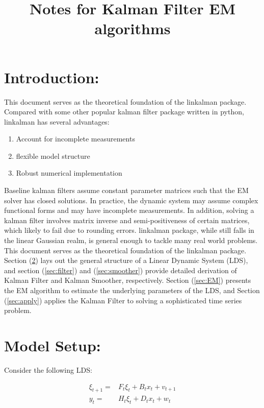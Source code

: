 \documentclass[12pt]{article}
\newenvironment{boenumerate}
    {\begin{enumerate}\renewcommand\labelenumi{\textbf\theenumi}}
    {\end{enumerate}}
\numberwithin{equation}{section}
\begin{document}
\title{Notes for Kalman Filter EM algorithms}

\section{Introduction:}

This document serves as the theoretical foundation of the linkalman package. Compared with some other popular kalman filter package written in python, linkalman has several advantages:

\begin{boenumerate}
    \item Account for incomplete measurements 
    \item flexible model structure
    \item Robust numerical implementation
\end{boenumerate}

Baseline kalman filters assume constant parameter matrices such that the EM solver has closed solutions. In practice, the dynamic system may assume complex functional forms and may have incomplete measurements. In addition, solving a kalman filter involves matrix inverse and semi-positiveness of certain matrices, which likely to fail due to rounding errors. linkalman package, while still falls in the linear Gaussian realm, is general enough to tackle many real world problems. This document serves as the theoretical foundation of the linkalman package. Section (\ref{sec:model_setup}) lays out the general structure of a Linear Dynamic System (LDS), and section (\ref{sec:filter}) and (\ref{sec:smoother}) provide detailed derivation of Kalman Filter and Kalman Smoother, respectively. Section (\ref{sec:EM}) presents the EM algorithm to estimate the underlying parameters of the LDS, and Section (\ref{sec:apply}) applies the Kalman Filter to solving a sophisticated time series problem. 

\section{Model Setup:} \label{sec:model_setup}

Consider the following LDS:

\begin{align}
    \xi_{t+1} = & F_{t}\xi_{t} + B_{t}x_t + v_{t+1} \label{eq:state_evolve} \\
    y_t = & H_t\xi_{t} + D_{t}x_t + w_t \label{eq:measure}
\end{align}
\end{document}
